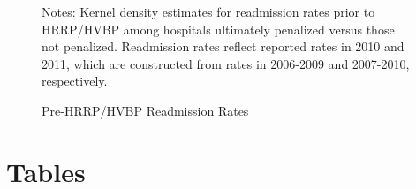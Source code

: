 \documentclass[12pt]{article}
\begin{document}
\newpage
{}
\setlength{\captionmargin}{.5 \textwidth} \addtolength{\captionmargin}{-.5\wd\gfxbox}
\begin{figure}[htbp!]
\centering
\caption{Pre-HRRP/HVBP Readmission Rates}
\label{fig:pre_readmits}
\usebox{\gfxbox}
\par
\begin{minipage}{\wd\gfxbox}
\footnotesize
Notes:  Kernel density estimates for readmission rates prior to HRRP/HVBP among hospitals ultimately penalized versus those not penalized. Readmission rates reflect reported rates in 2010 and 2011, which are constructed from rates in 2006-2009 and 2007-2010, respectively.
\end{minipage}
\end{figure}
\newpage


\section*{Tables}
\end{document}
